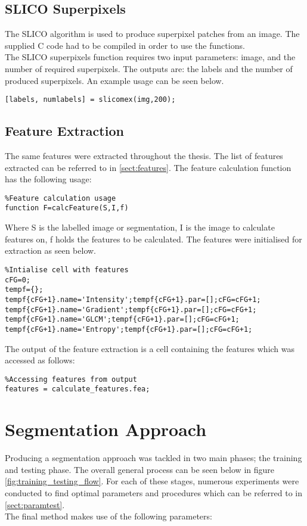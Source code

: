 \subsection{SLICO Superpixels}
\label{sect:slico}
The SLICO algorithm is used to produce superpixel patches from an image. The supplied C code had to be compiled in order to use the functions.
\\[1\baselineskip]
 The SLICO superpixels function requires two input parameters: image, and the number of required superpixels. The outputs are: the labels and the number of produced superpixels. An example usage can be seen below. 
\begin{lstlisting}
[labels, numlabels] = slicomex(img,200);
\end{lstlisting}
\subsection{Feature Extraction}
\label{sect:calcFeature}
The same features were extracted throughout the thesis. The list of features extracted can be referred to in \ref{sect:features}. The feature calculation function has the following usage:
\begin{lstlisting}
%Feature calculation usage
function F=calcFeature(S,I,f)
\end{lstlisting}
\medskip
Where S is the labelled image or segmentation, I is the image to calculate features on, f holds the features to be calculated. The features were initialised for extraction as seen below.
\begin{lstlisting}
%Intialise cell with features
cFG=0;
tempf={};
tempf{cFG+1}.name='Intensity';tempf{cFG+1}.par=[];cFG=cFG+1;
tempf{cFG+1}.name='Gradient';tempf{cFG+1}.par=[];cFG=cFG+1;
tempf{cFG+1}.name='GLCM';tempf{cFG+1}.par=[];cFG=cFG+1;
tempf{cFG+1}.name='Entropy';tempf{cFG+1}.par=[];cFG=cFG+1;
\end{lstlisting}
\medskip
The output of the feature extraction is a cell containing the features which was accessed as follows:
\begin{lstlisting}
%Accessing features from output
features = calculate_features.fea;
\end{lstlisting}

\section{Segmentation Approach}
\label{sect: segapproach}
Producing a segmentation approach was tackled in two main phases; the training and testing phase. The overall general process can be seen below in figure \ref{fig:training_testing_flow}. For each of these stages, numerous experiments were conducted to find optimal parameters and procedures which can be referred to in \ref{sect:paramtest}.
\\[1\baselineskip]
The final method makes use of the following parameters:

